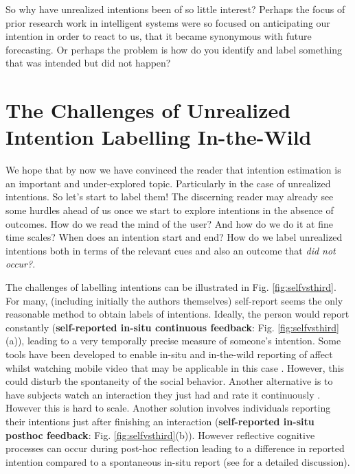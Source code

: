 \documentclass[sigconf]{acmart}
\begin{document}
So why have unrealized intentions been of so little interest? Perhaps the focus of prior research work in intelligent systems were so focused on anticipating our intention in order to react to us, that it became synonymous with future forecasting. Or perhaps the problem is how do you identify and label something that was intended but did not happen?



\section{The Challenges of Unrealized Intention Labelling In-the-Wild}
\label{sec:challenge}
We hope that by now we have convinced the reader that intention estimation is an important and under-explored topic. Particularly in the case of unrealized intentions. So let's start to label them! The discerning reader may already see some hurdles ahead of us once we start to explore intentions in the absence of outcomes. How do we read the mind of the user? And how do we do it at fine time scales? When does an intention start and end? How do we label unrealized intentions both in terms of the relevant cues and also an outcome that \emph{did not occur?}. 

The challenges of labelling intentions can be illustrated in Fig. \ref{fig:selfvsthird}. For many, (including initially the authors themselves) self-report seems the only reasonable method to obtain labels of intentions. Ideally, the person would report constantly (\textbf{self-reported in-situ continuous feedback}: Fig. \ref{fig:selfvsthird}(a)), leading to a very temporally precise measure of someone's intention. Some tools have been developed to enable in-situ and in-the-wild reporting of affect whilst watching mobile video that may be applicable in this case \cite{zhang2020rcea}. However, this could disturb the spontaneity of the social behavior. Another alternative is to have subjects watch an interaction they just had and rate it continuously \cite{templeton2023long}. However this is hard to scale. Another solution involves individuals reporting their intentions just after finishing an interaction (\textbf{self-reported in-situ posthoc feedback}: Fig. \ref{fig:selfvsthird}(b)). However reflective cognitive processes can occur during post-hoc reflection leading to a difference in reported intention compared to a spontaneous in-situ report (see \cite{Dudzik2023} for a detailed discussion). 
 
\end{document}
